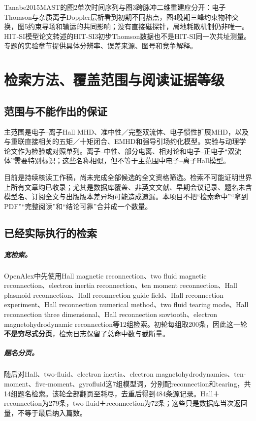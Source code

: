 \documentclass[UTF8,a4paper,11pt,openany,fontset=fandol]{ctexbook}
\begin{document}
Tanabe2015MAST的图2单次时间序列与图3跨脉冲二维重建应分开：电子Thomson与杂质离子Doppler层析看到初期不同热点，图4晚期三峰约束物种交换，图5约束导场和输运的共同影响；没有直接磁探针，局地耗散机制仍非唯一。HIT-SI模型论文转述的HIT-SI3初步Thomson数据也不是HIT-SI同一次共址测量。专题的实验章节提供具体分辨率、误差来源、图号和竞争解释。\citep{Tanabe2015MAST,Kaptanoglu2020}


\chapter{检索方法、覆盖范围与阅读证据等级}
\section{范围与不能作出的保证}
主范围是电子--离子Hall MHD、准中性／完整双流体、电子惯性扩展MHD，以及与重联直接相关的五矩／十矩闭合、EMHD和强导引场约化模型。实验与动理学论文作为检验或对照单列。离子--中性、部分电离、相对论和电子--正电子“双流体”需要特别标识；这些名称相似，但不等于主范围中电子--离子Hall模型。

目前是持续核读工作稿，尚未完成全部候选的全文资格筛选。检索不可能证明世界上所有文章均已收录；尤其是数据库覆盖、非英文文献、早期会议记录、题名未含模型名、订阅全文与出版版本差异均可能造成遗漏。本项目不把“检索命中”“拿到PDF”“完整阅读”和“结论可靠”合并成一个数量。

\section{已经实际执行的检索}
\paragraph{宽检索。}OpenAlex中先使用Hall magnetic reconnection、two fluid magnetic reconnection、electron inertia reconnection、ten moment reconnection、Hall plasmoid reconnection、Hall reconnection guide field、Hall reconnection experiment、Hall reconnection numerical method、two fluid tearing mode、Hall reconnection three dimensional、Hall reconnection sawtooth、electron magnetohydrodynamic reconnection等12组检索。初轮每组取200条，因此这一轮\textbf{不是穷尽式分页}，检索日志保留了总命中数与截断量。

\paragraph{题名分页。}随后对Hall、two-fluid、electron inertia、electron magnetohydrodynamics、ten-moment、five-moment、gyrofluid这7组模型词，分别配reconnection和tearing，共14组题名检索。该轮全部翻页至耗尽，去重后得到484条源记录。Hall＋reconnection为279条，two-fluid＋reconnection为72条；这些只是数据库当次返回量，不等于最后纳入篇数。
\end{document}
